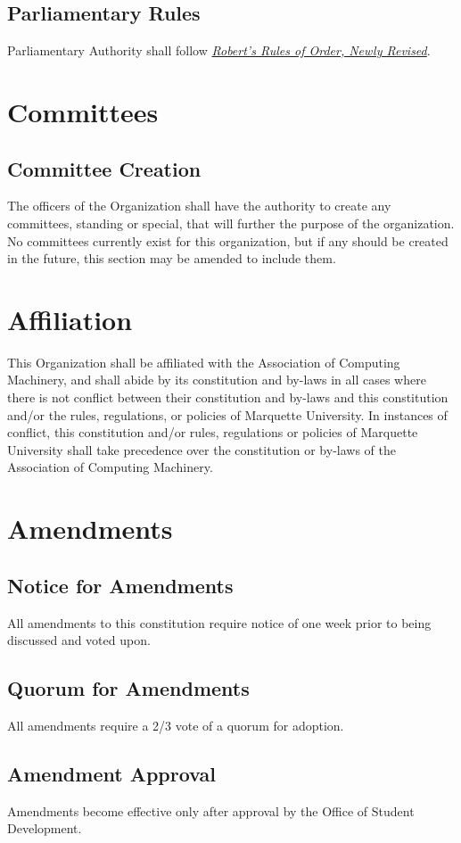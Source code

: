 \documentclass{article}
\begin{document}
\subsection{Parliamentary Rules}
Parliamentary Authority shall follow \underline{\textit{Robert’s Rules of Order, Newly Revised}}.

\section{Committees}
\subsection{Committee Creation}
The officers of the Organization shall have the authority to create any
committees, standing or special, that will further the purpose of the
organization.  No committees currently exist for this organization, but if any should be created in the future, this section may be amended to include them.

\section{Affiliation}
This Organization shall be affiliated with the Association of Computing Machinery, and shall abide by its constitution and by-laws in all cases where there is not conflict between their constitution and by-laws and this constitution and/or the rules, regulations, or policies of Marquette University.  In instances of conflict, this constitution and/or rules, regulations or policies of Marquette University shall take precedence over the constitution or by-laws of the Association of Computing Machinery.

\section{Amendments}
\subsection{Notice for Amendments}
All amendments to this constitution require notice of one week prior to being discussed and voted upon.
\subsection{Quorum for Amendments}
All amendments require a 2/3 vote of a quorum for adoption.
\subsection{Amendment Approval}
Amendments become effective only after approval by the Office of Student Development.
\end{document}
